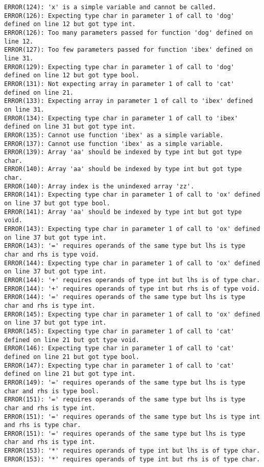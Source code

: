 \documentclass[12pt]{book}
\begin{document}
\begin{lstlisting}
ERROR(124): 'x' is a simple variable and cannot be called.
ERROR(126): Expecting type char in parameter 1 of call to 'dog' defined on line 12 but got type int.
ERROR(126): Too many parameters passed for function 'dog' defined on line 12.
ERROR(127): Too few parameters passed for function 'ibex' defined on line 31.
ERROR(129): Expecting type char in parameter 1 of call to 'dog' defined on line 12 but got type bool.
ERROR(131): Not expecting array in parameter 1 of call to 'cat' defined on line 21.
ERROR(133): Expecting array in parameter 1 of call to 'ibex' defined on line 31.
ERROR(134): Expecting type char in parameter 1 of call to 'ibex' defined on line 31 but got type int.
ERROR(135): Cannot use function 'ibex' as a simple variable.
ERROR(137): Cannot use function 'ibex' as a simple variable.
ERROR(139): Array 'aa' should be indexed by type int but got type char.
ERROR(140): Array 'aa' should be indexed by type int but got type char.
ERROR(140): Array index is the unindexed array 'zz'.
ERROR(141): Expecting type char in parameter 1 of call to 'ox' defined on line 37 but got type bool.
ERROR(141): Array 'aa' should be indexed by type int but got type void.
ERROR(143): Expecting type char in parameter 1 of call to 'ox' defined on line 37 but got type int.
ERROR(143): '=' requires operands of the same type but lhs is type char and rhs is type void.
ERROR(144): Expecting type char in parameter 1 of call to 'ox' defined on line 37 but got type int.
ERROR(144): '+' requires operands of type int but lhs is of type char.
ERROR(144): '+' requires operands of type int but rhs is of type void.
ERROR(144): '=' requires operands of the same type but lhs is type char and rhs is type int.
ERROR(145): Expecting type char in parameter 1 of call to 'ox' defined on line 37 but got type int.
ERROR(145): Expecting type char in parameter 1 of call to 'cat' defined on line 21 but got type void.
ERROR(146): Expecting type char in parameter 1 of call to 'cat' defined on line 21 but got type bool.
ERROR(147): Expecting type char in parameter 1 of call to 'cat' defined on line 21 but got type int.
ERROR(149): '=' requires operands of the same type but lhs is type char and rhs is type bool.
ERROR(151): '=' requires operands of the same type but lhs is type char and rhs is type int.
ERROR(151): '=' requires operands of the same type but lhs is type int and rhs is type char.
ERROR(151): '=' requires operands of the same type but lhs is type char and rhs is type int.
ERROR(153): '*' requires operands of type int but lhs is of type char.
ERROR(153): '*' requires operands of type int but rhs is of type char.

\end{lstlisting}
\end{document}
